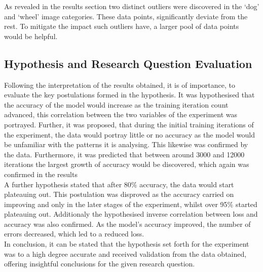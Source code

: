 As revealed in the results section two distinct outliers were discovered in the ‘dog’ and ‘wheel’ image categories. These data points, significantly deviate from the rest. To mitigate the impact such outliers have, a larger pool of data points would be helpful. \\

\subsection{Hypothesis and Research Question Evaluation}
Following the interpretation of the results obtained, it is of importance, to evaluate the key postulations formed in the hypothesis. It was hypothesised that the accuracy of the model would increase as the training iteration count advanced, this correlation between the two variables of the experiment was portrayed. Further, it was proposed, that during the initial training iterations of the experiment, the data would portray little or no accuracy as the model would be unfamiliar with the patterns it is analysing. This likewise was confirmed by the data. Furthermore, it was predicted that between around 3000 and 12000 iterations the largest growth of accuracy would be discovered, which again was confirmed in the results\\


A further hypothesis stated that after 80\% accuracy, the data would start plateauing out. This postulation was disproved as the accuracy carried on improving and only in the later stages of the experiment, whilst over 95\% started plateauing out.  Additionaly the hypothesised inverse correlation between loss and accuracy was also confirmed. As the model's accuracy improved, the number of errors decreased, which led to a reduced loss.\\ 

In conclusion, it can be stated that the hypothesis set forth for the experiment was to a high degree accurate and received validation from the data obtained, offering insightful conclusions for the given research question. 	\\	

